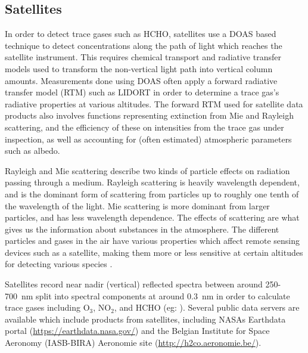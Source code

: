   \subsection{Satellites}
  \label{Model:Meas:sat}
    
    In order to detect trace gases such as HCHO, satellites use a DOAS based technique to detect concentrations along the path of light which reaches the satellite instrument.
    This requires chemical transport and radiative transfer models used to transform the non-vertical light path into vertical column amounts.
    Measurements done using DOAS often apply a forward radiative transfer model (RTM) such as LIDORT in order to determine a trace gas's radiative properties at various altitudes.
    The forward RTM used for satellite data products also involves functions representing extinction from Mie and Rayleigh scattering, and the efficiency of these on intensities from the trace gas under inspection, as well as accounting for (often estimated) atmospheric parameters such as albedo.
    
    
    Rayleigh and Mie scattering describe two kinds of particle effects on radiation passing through a medium.
    Rayleigh scattering is heavily wavelength dependent, and is the dominant form of scattering from particles up to roughly one tenth of the wavelength of the light.
    Mie scattering is more dominant from larger particles, and has less wavelength dependence.
    The effects of scattering are what gives us the information about substances in the atmosphere.
    The different particles and gases in the air have various properties which affect remote sensing devices such as a satellite, making them more or less sensitive at certain altitudes for detecting various species \parencite[e.g.]{Martin2002}.
    
    Satellites record near nadir (vertical) reflected spectra between around 250-700~nm split into spectral components at around $0.3$~nm in order to calculate trace gases including O$_3$, NO$_2$, and HCHO (eg: \textcite{Leue2001}).
    Several public data servers are available which include products from satellites, including NASAs Earthdata portal (\url{https://earthdata.nasa.gov/}) and the Belgian Institute for Space Aeronomy (IASB-BIRA) Aeronomie site (\url{http://h2co.aeronomie.be/}).
    
